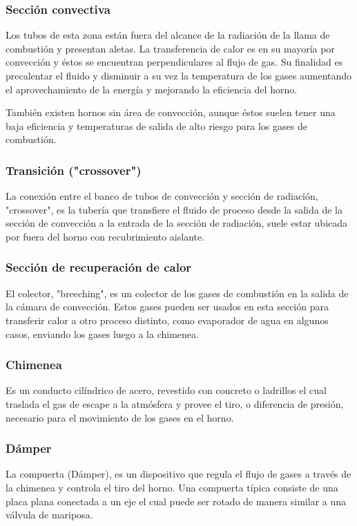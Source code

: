 \subsubsection{Sección convectiva}
\par Los tubos de esta zona están fuera del alcance de la radiación de la llama de combustión y presentan aletas. La transferencia de calor es en su mayoría por convección y éstos se encuentran perpendiculares al flujo de gas. Su finalidad es precalentar el fluido y disminuir a su vez la temperatura de los gases aumentando el aprovechamiento de la energía y mejorando la eficiencia del horno.
\par También existen hornos sin área de convección, aunque éstos suelen tener una baja eficiencia y temperaturas de salida de alto riesgo para los gases de combustión.

\subsubsection{Transición ("crossover")}
\par La conexión entre el banco de tubos de convección y sección de radiación, "crossover", es la tubería que transfiere el fluido de proceso desde la salida de la sección de convección a la entrada de la sección de radiación, suele estar ubicada por fuera del horno con recubrimiento aislante.

\subsubsection{Sección de recuperación de calor}
\par El colector, "breeching", es un colector de los gases de combustión en la salida de la cámara de convección. Estos gases pueden ser usados en esta sección para transferir calor a otro proceso distinto, como evaporador de agua en algunos casos, enviando los gases luego a la chimenea.

\subsubsection{Chimenea}
\par Es un conducto cilíndrico de acero, revestido con concreto o ladrillos el cual traslada el gas de escape a la atmósfera y provee el tiro, o diferencia de presión, necesario para el movimiento de los gases en el horno.

\subsubsection{Dámper}
\par La compuerta (Dámper), es un dispositivo que regula el flujo de gases a través de la chimenea y controla el tiro del horno. Una compuerta típica consiste de una placa plana conectada a un eje el cual puede ser rotado de manera similar a una válvula de mariposa.

